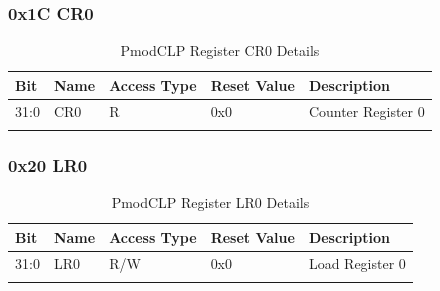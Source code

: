 \subsubsection*{0x1C CR0}
\begin{longtable}{|p{1.5cm}|p{3cm}|p{2cm}|p{2cm}|p{5cm}|}
\hline
\textbf{Bit} & \textbf{Name} & \textbf{Access Type} & \textbf{Reset Value} & \textbf{Description} \\
\hline
31:0 & CR0 & R & 0x0 & Counter Register 0 \\
\hline
\caption{PmodCLP Register CR0 Details}
\end{longtable}

\subsubsection*{0x20 LR0}
\begin{longtable}{|p{1.5cm}|p{3cm}|p{2cm}|p{2cm}|p{5cm}|}
\hline
\textbf{Bit} & \textbf{Name} & \textbf{Access Type} & \textbf{Reset Value} & \textbf{Description} \\
\hline
31:0 & LR0 & R/W & 0x0 & Load Register 0 \\
\hline
\caption{PmodCLP Register LR0 Details}
\end{longtable}